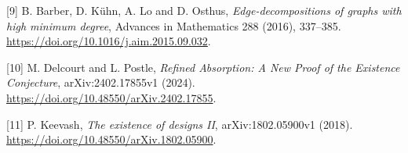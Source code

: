 \documentclass[spanish,11pt,a4paper]{article}
\begin{document}
\begin{minipage}{\linewidth}
{[}9{]} B. Barber, D. Kühn, A. Lo and D. Osthus, \emph{Edge-decompositions of graphs with high minimum degree}, Advances in Mathematics 288 (2016), 337--385. \url{https://doi.org/10.1016/j.aim.2015.09.032}.

{[}10{]} M. Delcourt and L. Postle, \emph{Refined Absorption: A New Proof of the Existence Conjecture}, arXiv:2402.17855v1 (2024). \url{https://doi.org/10.48550/arXiv.2402.17855}.

{[}11{]} P. Keevash, \emph{The existence of designs II}, arXiv:1802.05900v1 (2018). \url{https://doi.org/10.48550/arXiv.1802.05900}.

\endgroup

\end{minipage}
\end{document}
